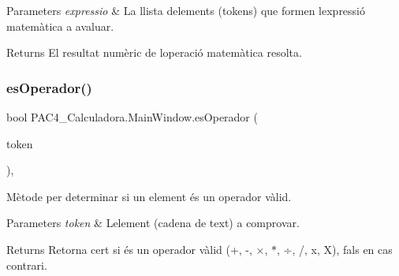 \begin{DoxyParams}{Parameters}
{\em expressio} & La llista d\textquotesingle{}elements (tokens) que formen l\textquotesingle{}expressió matemàtica a avaluar.\\
\hline
\end{DoxyParams}
\begin{DoxyReturn}{Returns}
El resultat numèric de l\textquotesingle{}operació matemàtica resolta.
\end{DoxyReturn}
\mbox{\label{class_p_a_c4___calculadora_1_1_main_window_af6006833170f4d7a2929bc70f6b420de}} 
\subsubsection{\texorpdfstring{es\+Operador()}{esOperador()}}
{\footnotesize\ttfamily bool P\+A\+C4\+\_\+\+Calculadora.\+Main\+Window.\+es\+Operador (\begin{DoxyParamCaption}\item[{string}]{token }\end{DoxyParamCaption})\hspace{0.3cm}{\ttfamily [inline]}, {\ttfamily [private]}}



Mètode per determinar si un element és un operador vàlid. 


\begin{DoxyParams}{Parameters}
{\em token} & L\textquotesingle{}element (cadena de text) a comprovar.\\
\hline
\end{DoxyParams}
\begin{DoxyReturn}{Returns}
Retorna cert si és un operador vàlid (+, -\/, ×, $\ast$, ÷, /, x, X), fals en cas contrari.
\end{DoxyReturn}
\mbox{\label{class_p_a_c4___calculadora_1_1_main_window_a5e7174a57d9b4003763d5c50646e1466}} 

